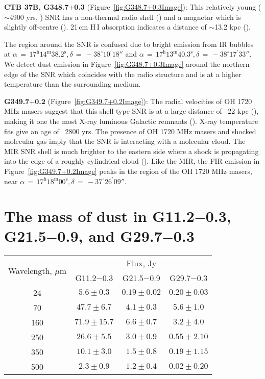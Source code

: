 \documentclass[fleqn,usenatbib]{mnras}
\begin{document}
{\textbf{CTB 37B, G348.7$+$0.3} (Figure~\ref{fig:G348.7+0.3Image}): This relatively young ($\sim$4900 yrs, \citealp{HESSCollaboration2008b}) SNR has a non-thermal radio shell (\citealp{Whiteoak1996}) and a magnetar which is slightly off-centre (\citealp{Halpern2010}). 21\,cm H\,{\small I} absorption indicates a distance of $\sim$13.2 kpc (\citealp{Tian2012}).

The region around the SNR is confused due to bright emission from IR bubbles at $\alpha\,=\,17^\text{h}14^\text{m}38.2^\text{s}, \delta\,=\,-38^\circ10^\prime18''$ and $\alpha\,=\,17^\text{h}13^\text{m}40.3^\text{s}, \delta\,=\,-38^\circ17^\prime33''$. We detect dust emission in Figure~\ref{fig:G348.7+0.3Image} around the northern edge of the SNR which coincides with the radio structure and is at a higher temperature than the surrounding medium.
\bigskip

\textbf{G349.7$+$0.2} (Figure~\ref{fig:G349.7+0.2Image}): The radial velocities of OH 1720 MHz masers suggest that this shell-type SNR is at a large distance of ~22 kpc (\citealp{Frail1996}), making it one the most X-ray luminous Galactic remnants (\citealp{Slane2002}). X-ray temperature fits give an age of ~2800 yrs. The presence of OH 1720 MHz masers and shocked molecular gas imply that the SNR is interacting with a molecular cloud. The MIR SNR shell is much brighter to the eastern side where a shock is propagating into the edge of a roughly cylindrical cloud (\citealp{Reach2006}). Like the MIR, the FIR emission in Figure~\ref{fig:G349.7+0.2Image} peaks in the region of the OH 1720 MHz masers, near $\alpha\,=\,17^\text{h}18^\text{m}00^\text{s}, \delta\,=\,-37^\circ26^\prime09''$.


\section{The mass of dust in G11.2$-$0.3, G21.5$-$0.9, and G29.7$-$0.3} \label{DustMasses}
\begin{table}
	\begin{tabular}{c c c c}
	\hline
	\multirow{2}{*}{Wavelength, $\mu$m} & \multicolumn{3}{c}{Flux, Jy} \\
	    & G11.2$-$0.3     & G21.5$-$0.9     & G29.7$-$0.3 \\ \hline\hline
	24  & $5.6 \pm 0.3$   & $0.19 \pm 0.02$ & $0.20 \pm 0.03$ \\
	70  & $47.7 \pm 6.7$  & $4.1 \pm 0.3$   & $5.6 \pm 1.0$ \\
	160 & $71.9 \pm 15.7$ & $6.6 \pm 0.7$   & $3.2 \pm 4.0$ \\
	250 & $26.6 \pm 5.5$  & $3.0 \pm 0.9$   & $0.55 \pm 2.10$ \\
	350 & $10.1 \pm 3.0$  & $1.5 \pm 0.8$   & $0.19 \pm 1.15$ \\
	500 & $2.3 \pm 0.9$   & $1.2 \pm 0.4$   & $0.02 \pm 0.20$ \\ \hline


\end{tabular}
\end{table}}
\end{document}
